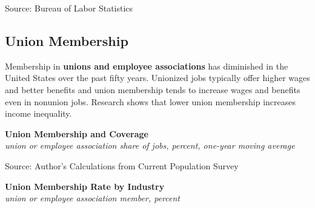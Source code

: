 \documentclass{report}
\makeatletter
\newcommand{\tbllink}[1]{\href{https://raw.githubusercontent.com/bdecon/US-chartbook/master/chartbook/data/#1}{\faTable}}
\newcommand*\short[1]{\expandafter\@gobbletwo\number\numexpr#1\relax}
\newcommand{\ctsbar}[5]{
		\addplot[ybar stacked, bar width=#5, draw opacity=0, fill=#1] 
			table [x=#2, y=#3, col sep=comma]{#4};}
\newcommand{\dateaxisticks}{
		date coordinates in=x, axis line style={draw=none},
		xmax={2024-01-31},
		max space between ticks=40,	    
		xtick={{1990-01-01}, {1992-01-01}, {1994-01-01}, 
			{1996-01-01}, {1998-01-01}, {2000-01-01}, 
			{2002-01-01}, {2004-01-01}, {2006-01-01},
			{2008-01-01}, {2010-01-01}, {2012-01-01}, {2014-01-01},
		    {2016-01-01}, {2018-01-01}, {2020-01-01}, {2022-01-01}, 
		    {2024-01-01}, {2026-01-01}},
		minor xtick={{1989-01-01}, {1991-01-01}, {1993-01-01},
			{1995-01-01}, {1997-01-01}, {1999-01-01}, 
			{2001-01-01}, {2003-01-01}, {2005-01-01}, {2007-01-01},
		    {2009-01-01}, {2011-01-01}, {2013-01-01}, {2015-01-01},
		    {2017-01-01}, {2019-01-01}, {2021-01-01}, {2023-01-01}, 
		    {2025-01-01}, {2027-01-01}},
		enlarge y limits={0.06}, enlarge x limits={0.01},
		xticklabel style={align=center, yshift=-2pt}, tick label style={inner sep=0pt},
		}
\newcommand{\bbar}[2]{extra #1 ticks = {{#2}}, extra #1 tick labels = ,
		extra #1 tick style = {grid=major, grid style={thick, black!25}},}
\newcommand{\rbars}{
		\fill[color=black!10] (axis cs:{1990-07-01},\pgfkeysvalueof{/pgfplots/ymin})
			rectangle (axis cs:{1991-03-01}, \pgfkeysvalueof{/pgfplots/ymax});
		\fill[color=black!10] (axis cs:{2007-12-01},\pgfkeysvalueof{/pgfplots/ymin})
			rectangle (axis cs:{2009-07-01}, \pgfkeysvalueof{/pgfplots/ymax});
		\fill[color=black!10] (axis cs:{2001-03-01},\pgfkeysvalueof{/pgfplots/ymin})
			rectangle (axis cs:{2001-11-01}, \pgfkeysvalueof{/pgfplots/ymax});
		\fill[color=black!10] (axis cs:{2020-02-01},\pgfkeysvalueof{/pgfplots/ymin})
			rectangle (axis cs:{2020-05-01}, \pgfkeysvalueof{/pgfplots/ymax});}
\makeatother
\begin{document}
{\begin{minipage}{1.0\textwidth}
\footnotesize{Source: Bureau of Labor Statistics} \hfill \tbllink{tfp.csv} 
\end{minipage}
\newpage
\hypertarget{labun}{\label{labun}}
\begin{minipage}{1.0\textwidth}
\subsection*{Union Membership}
\small Membership in \textbf{unions and employee associations} has diminished in the United States over the past fifty years. Unionized jobs typically offer higher wages and better benefits and union membership tends to increase wages and benefits even in nonunion jobs. Research shows that lower union membership increases income inequality. 


\vspace{1mm}

\normalsize \textbf{Union Membership and Coverage}\\
\footnotesize{\textit{union or employee association share of jobs, percent, one-year moving average}}
\vspace{2.6cm}

\hspace{2mm} 

\footnotesize{Source: Author's Calculations from Current Population Survey} \hfill \tbllink{union.csv}
\end{minipage}
\vspace{4mm}

\begin{minipage}{0.405\textwidth}
\normalsize \textbf{Union Membership Rate by Industry}\\
\footnotesize{\textit{union or employee association member, percent}}
\vspace{6.3cm}


\end{minipage}}
\end{document}
